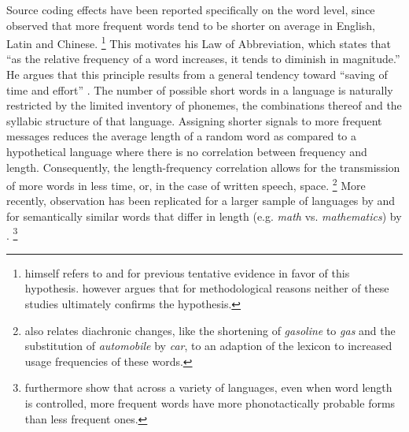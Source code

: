 Source coding effects have been reported specifically on the word level, since \citet{zipf1935} observed that more frequent words tend to be shorter on average in English, Latin and Chinese.%
%
\footnote{\citeauthor{zipf1935} himself refers to \citet{kaeding1897} and \citet{eldridge1911} for previous tentative evidence in favor of this hypothesis. \citet[23--25]{zipf1935} however argues that for methodological reasons neither of these studies ultimately confirms the hypothesis.}\afterfn%
%
This motivates his Law of Abbreviation, which states that ``as the relative frequency of a word increases, it tends to diminish in magnitude.'' He argues that this principle results from a general tendency toward ``saving of time and effort'' \citep[38]{zipf1935}. The number of possible short words in a language is naturally restricted by the limited inventory of phonemes, the combinations thereof and the syllabic structure of that language. Assigning shorter signals to more frequent messages reduces the average length of a random word as compared to a hypothetical language where there is no correlation between frequency and length. Consequently, the length-frequency correlation allows for the transmission of more words in less time, or, in the case of written speech, space.%
%
\footnote{\citet[30-36]{zipf1935} also relates diachronic changes, like the shortening of \textit{gasoline} to \textit{gas} and the substitution of \textit{automobile} by \textit{car}, to an adaption of the lexicon to increased usage frequencies of these words.}\afterfn%
%
More recently,  observation has been replicated for a larger sample of languages by \citet{piantadosi.etal2011} and for semantically similar words that differ in length (e.g. \textit{math} vs. \textit{mathematics}) by \citet{mahowald.etal2013}.%
%
\footnote{\citet{mahowald.etal2018} furthermore show that across a variety of languages, even when word length is controlled, more frequent words have more phonotactically probable forms than less frequent ones.}\afterfn%
%

